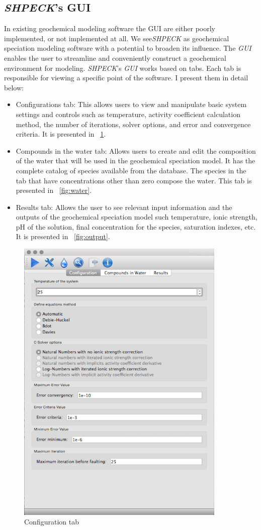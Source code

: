 \subsection{\emph{SHPECK}'s GUI }
In existing geochemical modeling software the GUI are either poorly implemented, or not implemented at all. We see\emph{SHPECK} as geochemical speciation modeling software with a potential to broaden its influence. The \emph{GUI} enables the user to streamline and conveniently construct a geochemical environment for modeling.
\emph{SHPECK}'s \emph{GUI} works based on tabs. Each tab is responsible for viewing a specific point of the software. I present them in detail below:
\begin{itemize}
\item Configurations tab: This allows users to view and manipulate basic system settings and controls such as temperature, activity coefficient calculation method, the number of iterations, solver options, and error and convergence criteria. It is presented in ~\ref{fig:config}.
\item Compounds in the water tab: Allows users to create and edit the composition of the water that will be used in the geochemical speciation model. It has the complete catalog of species available from the database. The species in the tab that have concentrations other than zero compose the water. This tab is presented in ~\ref{fig:water}.
\item Results tab: Allows the user to see relevant input information and the outputs of the geochemical speciation model such temperature, ionic strength, pH of the solution, final concentration for the species, saturation indexes, etc. It is presented in ~\ref{fig:output}.
\end{itemize}


\begin{figure}[ht!]
\centering
\includegraphics[width=100mm]{figures/shpeck-configtab.png}
\caption{Configuration tab}
\label{fig:config}
\end{figure}

